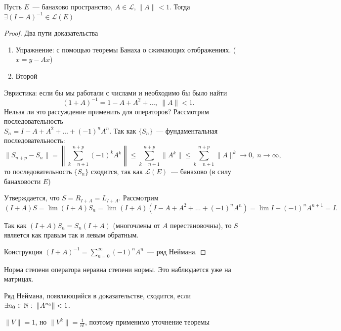\begin{theorem}[8.2]\label{theorem8.2}
    Пусть $E$~--- банахово пространство, $A \in \mathcal{L}, \|A\| < 1$. Тогда $\exists (I+A)^{-1} \in \mathcal{L}(E)$ 
\end{theorem}
\begin{proof}
    Два пути доказательства
    \begin{enumerate}
        \item Упражнение: с помощью теоремы Банаха о сжимающих отображениях. ($x=y-Ax$)
        \item Второй
    \end{enumerate}

    Эвристика: если бы мы работали с числами и необходимо бы было найти $$(1 + A)^{-1} = 1 - A + A^2 + \ldots, \; \|A\| < 1.$$
    Нельзя ли это рассуждение применить для операторов? Рассмотрим последовательность\\$S_n = I - A + A^2 + \ldots + (-1)^nA^n$.
    Так как $\{S_n\}$~--- фундаментальная последовательность:
    \[
    \|S_{n + p} - S_n\| = \left\| \sum_{k = n + 1}^{n + p} (-1)^k A^k\right\| \leq \sum_{k = n + 1}^{n + p} \|A^k\| \leq \sum_{k = n + 1}^{n + p} \|A\|^k \to 0,\; n \to \infty,
    \]
    то последовательность $\{S_n\}$ сходится, так как $\mathcal{L}(E)$~--- банахово (в силу банаховости $E$)

    Утверждается, что $S=R_{I+A}=L_{I+A}$. Рассмотрим \[ (I+A)S = \lim (I+A)S_n = \lim (I+A)(I-A+A^2 +\ldots +(-1)^nA^n)=\lim I+(-1)^n A^{n+1}=I. \]

    Так как $(I+A)S_n = S_n(I+A)$ (многочлены от $A$ перестановочны), то $S$ является как правым так и левым обратным.
    
    Конструкция $(I + A)^{-1} = \sum_{n = 0}^\infty (-1)^n A^n$~--- ряд Неймана.
\end{proof}

\begin{lemmanote}
    Норма степени оператора неравна степени нормы. Это наблюдается уже на матрицах.
\end{lemmanote}

\begin{lemmanote}
Ряд Неймана, появляющийся в доказательстве, сходится, если $\exists n_0 \in \mathbb{N}:\; \|A^{n_0}\| < 1$.
\end{lemmanote}

\begin{example}
    $\|V\|=1$, но $\|V^k\|=\frac 1 {n!}$, поэтому применимо уточнение теоремы
\end{example}

